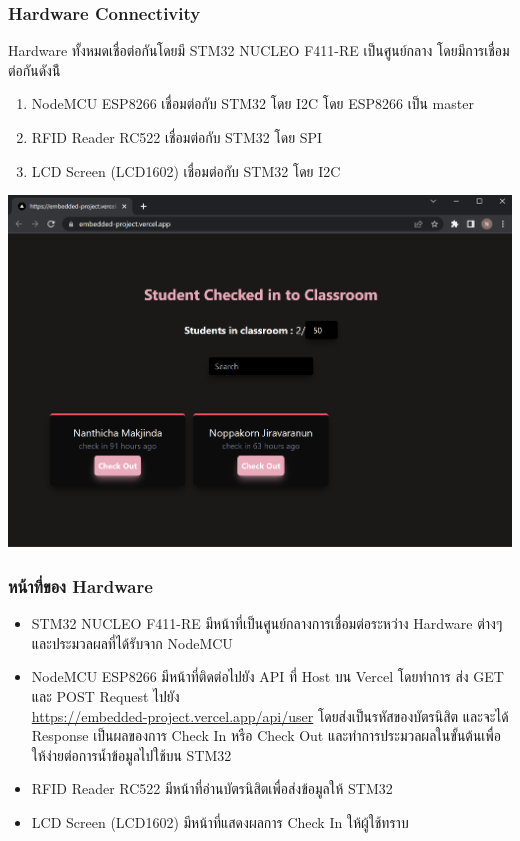 \documentclass[fontsize=14pt]{extarticle}
\begin{document}
\subsubsection{Hardware Connectivity}
Hardware ทั้งหมดเชื่อต่อกันโดยมี STM32 NUCLEO F411-RE เป็นศูนย์กลาง โดยมีการเชื่อมต่อกันดังน้ี
\begin{enumerate}
    \item NodeMCU ESP8266 เชื่อมต่อกับ STM32 โดย I2C โดย ESP8266 เป็น master
    \item RFID Reader RC522 เชื่อมต่อกับ STM32 โดย SPI
    \item LCD Screen (LCD1602) เชื่อมต่อกับ STM32 โดย I2C
\end{enumerate}
\begin{center}
    \includegraphics[width=\textwidth]{Web.png}
\end{center}
\pagebreak
\subsubsection{หน้าที่ของ Hardware}
\begin{itemize}
    \item STM32 NUCLEO F411-RE มีหน้าที่เป็นศูนย์กลางการเชื่อมต่อระหว่าง Hardware ต่างๆ และประมวลผลที่ได้รับจาก NodeMCU
    \item NodeMCU ESP8266 มีหน้าที่ติดต่อไปยัง API ที่ Host บน Vercel  โดยทำการ ส่ง GET และ POST Request ไปยัง \\ \url{https://embedded-project.vercel.app/api/user}  โดยส่งเป็นรหัสของบัตรนิสิต และจะได้ Response เป็นผลของการ Check In หรือ Check Out และทำการประมวลผลในขั้นต้นเพื่อให้ง่ายต่อการน้ำข้อมูลไปใช้บน STM32
    \item RFID Reader RC522 มีหน้าที่อ่านบัตรนิสิตเพื่อส่งข้อมูลให้ STM32
    \item LCD Screen (LCD1602) มีหน้าที่แสดงผลการ Check In ให้ผู้ใช้ทราบ
\end{itemize}
\end{document}
